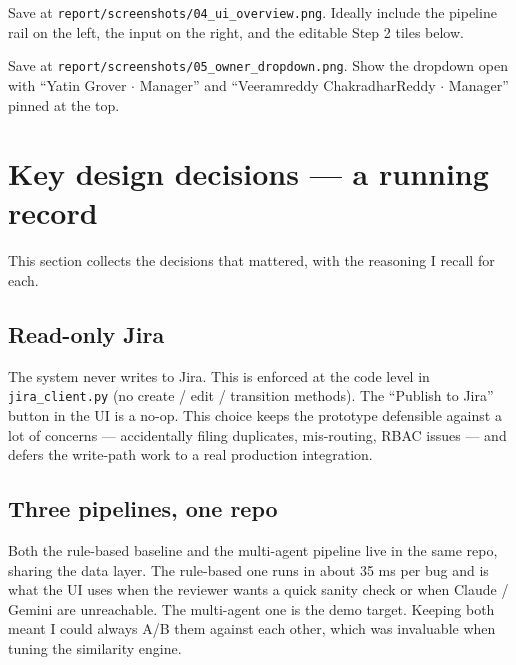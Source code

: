 \documentclass[11pt,a4paper]{article}
\begin{document}
\begin{screenshotbox}
Save at \texttt{report/screenshots/04\_ui\_overview.png}. Ideally include
the pipeline rail on the left, the input on the right, and the editable
Step 2 tiles below.
\end{screenshotbox}

\begin{screenshotbox}
Save at \texttt{report/screenshots/05\_owner\_dropdown.png}. Show the
dropdown open with ``Yatin Grover $\cdot$ Manager'' and ``Veeramreddy
ChakradharReddy $\cdot$ Manager'' pinned at the top.
\end{screenshotbox}

\newpage

\section{Key design decisions --- a running record}

This section collects the decisions that mattered, with the reasoning I
recall for each.

\subsection{Read-only Jira}

The system never writes to Jira. This is enforced at the code level in
\texttt{jira\_client.py} (no create / edit / transition methods). The
``Publish to Jira'' button in the UI is a no-op. This choice keeps the
prototype defensible against a lot of concerns --- accidentally filing
duplicates, mis-routing, RBAC issues --- and defers the write-path work
to a real production integration.

\subsection{Three pipelines, one repo}

Both the rule-based baseline and the multi-agent pipeline live in the same
repo, sharing the data layer. The rule-based one runs in about 35 ms per
bug and is what the UI uses when the reviewer wants a quick sanity check
or when Claude / Gemini are unreachable. The multi-agent one is the demo
target. Keeping both meant I could always A/B them against each other,
which was invaluable when tuning the similarity engine.
\end{document}
